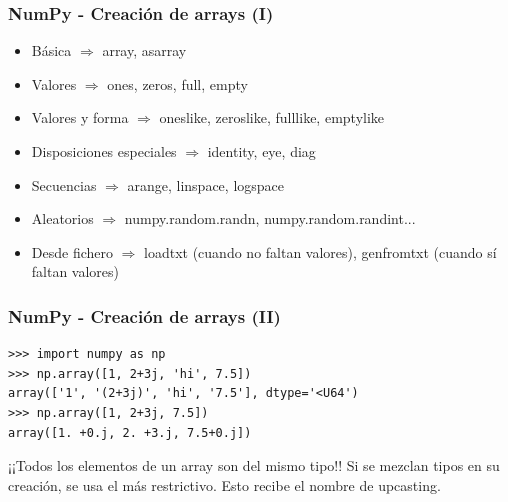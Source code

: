 \documentclass[18pt]{beamer}
\begin{document}
\begin{frame}[fragile]
	
	\frametitle{NumPy - Creación de arrays (I)}
    
	\begin{itemize}
		\setlength\itemsep{0.3em}	
		\item Básica $\Rightarrow $ array, asarray
		\item Valores $\Rightarrow $ ones, zeros, full, empty
		\item Valores y forma $\Rightarrow $ ones\textunderscore like,
		 zeros\textunderscore like, full\textunderscore like, 
		 empty\textunderscore like
		\item Disposiciones especiales $\Rightarrow $ identity, eye, diag
		\item Secuencias $\Rightarrow $	arange, linspace, logspace
		\item Aleatorios $\Rightarrow $	numpy.random.randn,
		 numpy.random.randint...
		\item Desde fichero $\Rightarrow $ loadtxt (cuando no faltan 
		 valores), genfromtxt (cuando sí faltan valores)
				
	\end{itemize}

\end{frame}

\begin{frame}[fragile]
	
	\frametitle{NumPy - Creación de arrays (II)}
		
	\begin{exampleblock}
	
		\small
	    \begin{lstlisting}
>>> import numpy as np
>>> np.array([1, 2+3j, 'hi', 7.5])
array(['1', '(2+3j)', 'hi', '7.5'], dtype='<U64')
>>> np.array([1, 2+3j, 7.5])
array([1. +0.j, 2. +3.j, 7.5+0.j])
    	\end{lstlisting}
    	
    \end{exampleblock}
      
   	\vspace{0.5cm}
    	
	\begin{alertblock}{¡¡Todos los elementos de un array son del mismo 
	tipo!!}
		Si se mezclan tipos en su creación, se usa el más
		 restrictivo. Esto recibe el nombre de upcasting.
	\end{alertblock}


\end{frame}
\end{document}

